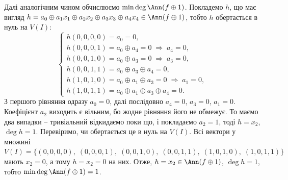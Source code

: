 Далі аналогічним чином обчислюємо $\min \deg \Ann(f \oplus 1)$. Покладемо $h$, що має вигляд 
$h = a_0 \oplus a_1 x_1 \oplus a_2 x_2 \oplus a_3 x_3 \oplus a_4 x_4 \in \Ann(f \oplus 1)$, тобто $h$ обертається 
в нуль на $V(I)$:
\begin{equation*}
    \begin{cases}
        h(0,0,0,0) = a_0 = 0,                                                 \\
        h(0,0,0,1) = a_0 \oplus a_4 = 0 \;\Rightarrow\; a_4 = 0,              \\
        h(0,0,1,0) = a_0 \oplus a_3 = 0 \;\Rightarrow\; a_3 = 0,              \\
        h(0,0,1,1) = a_0 \oplus a_3 \oplus a_4 = 0,                           \\
        h(1,0,1,0) = a_0 \oplus a_1 \oplus a_3 = 0 \;\Rightarrow\; a_1 = 0,   \\
        h(1,0,1,1) = a_0 \oplus a_1 \oplus a_3 \oplus a_4 = 0.
    \end{cases}
\end{equation*}
З першого рівняння одразу $a_0 = 0$, далі послідовно $a_4 = 0$, $a_3 = 0$, $a_1 = 0$. Коефіцієнт $a_2$ виходить 
є вільним, бо жодне рівняння його не обмежує. То маємо два випадки -- тривіальний відкидаємо поки що, і покладаємо 
$a_2 = 1$, тоді $h = x_2$, $\deg h = 1$. Перевіримо, чи обертається це в нуль на $V(I)$. Всі вектори у множині 
$V (I) = \{(0,0,0,0),\; (0,0,0,1),\; (0,0,1,0),\; (0,0,1,1),\; (1,0,1,0),\; (1,0,1,1)\}$ мають $x_2 = 0$, а тому 
$h = x_2 = 0$ на них. Отже, $h = x_2 \in \Ann(f \oplus 1)$, $\deg h = 1$, тобто $\min \deg \Ann(f \oplus 1) = 1$.

